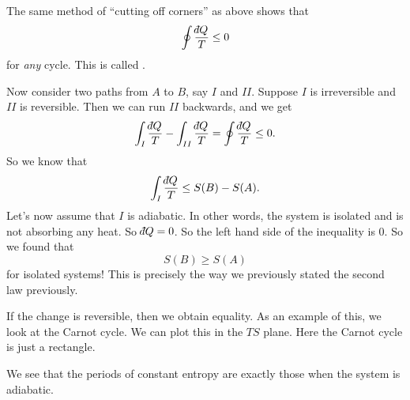 \documentclass[a4paper]{article}
\def\di{{\mathchar'26\mkern-12mu d}}
\begin{document}
The same method of ``cutting off corners'' as above shows that
\[
  \oint \frac{\di Q}{T} \leq 0
\]
for \emph{any} cycle. This is called .

Now consider two paths from $A$ to $B$, say $I$ and $II$. Suppose $I$ is irreversible and $II$ is reversible. Then we can run $II$ backwards, and we get
\[
  \int_I \frac{\di Q}{T} - \int_{II} \frac{\di Q}{T} = \oint \frac{\di Q}{T} \leq 0.
\]
So we know that
\[
  \int_I \frac{\di Q}{T} \leq S(B) - S(A).
\]
Let's now assume that $I$ is adiabatic. In other words, the system is isolated and is not absorbing any heat. So $\di Q = 0$. So the left hand side of the inequality is $0$. So we found that
\[
  S(B) \geq S(A)
\]
for isolated systems! This is precisely the way we previously stated the second law previously.

If the change is reversible, then we obtain equality. As an example of this, we look at the Carnot cycle. We can plot this in the $TS$ plane. Here the Carnot cycle is just a rectangle.
\begin{center}
\end{center}
We see that the periods of constant entropy are exactly those when the system is adiabatic.
\end{document}
